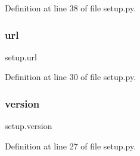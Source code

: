 Definition at line 38 of file setup.\+py.

\mbox{\label{namespacesetup_afc13124aa5c0124e84e1d965e3f4b0fb}} 
\subsubsection{\texorpdfstring{url}{url}}
{\footnotesize\ttfamily setup.\+url}



Definition at line 30 of file setup.\+py.

\mbox{\label{namespacesetup_a2aa722b36a933088812b50ea79b97a5c}} 
\subsubsection{\texorpdfstring{version}{version}}
{\footnotesize\ttfamily setup.\+version}



Definition at line 27 of file setup.\+py.

